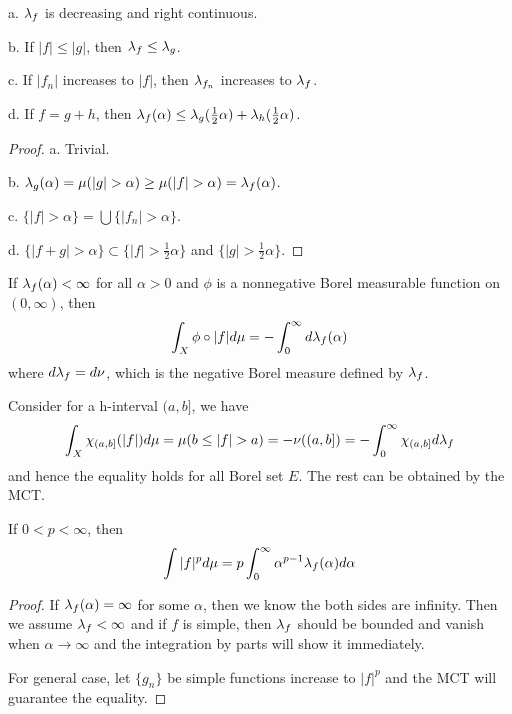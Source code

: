 \begin{proposition}
    a. $\lambda_{f}$ is decreasing and right continuous.\par
    b. If $|f|\leq |g|$, then $\lambda_{f} \leq \lambda_{g}$.\par
    c. If $|f_n|$ increases to $|f|$, then $\lambda_{f_n}$ increases to $\lambda_{f}$.\par
    d. If $f = g+h$, then $\lambda_{f}(\alpha) \leq \lambda_{g}(\tfrac{1}{2}\alpha)+\lambda_{h}(\tfrac{1}{2}\alpha)$.
\end{proposition}
\begin{proof}\par
    a. Trivial.\par
    b. $\dstrb{g}(\alpha) = \mu(|g|>\alpha) \geq \mu(|f|>\alpha) = \dstrb{f}(\alpha)$.\par
    c. $\{|f| > \alpha\} = \bigcup \{|f_n| > \alpha\}$.\par
    d. $\{|f+g|>\alpha\} \subset \{|f|>\tfrac{1}{2}\alpha\}$ and $\{|g|>\tfrac{1}{2}\alpha\}$.
\end{proof}

\begin{proposition}
    If $\lambda_{f}(\alpha) < \infty$ for all $\alpha > 0$ and $\phi$ is a nonnegative Borel measurable function on $(0,\infty)$, then
    \[\int_X \phi\circ |f|d\mu = - \int_0^{\infty}d\lambda_{f}(\alpha)\]
    where $d\lambda_{f} = d\nu$, which is the negative Borel measure defined by $\lambda_{f}$.
\end{proposition}
\begin{proposition}
    Consider for a h-interval $(a,b]$, we have
    \[\int_X \chi_{(a,b]}(|f|)d\mu = \mu(b\leq |f|>a) = -\nu((a,b]) = - \int_0^{\infty} \chi_{(a,b]} d\dstrb{f}\]
    and hence the equality holds for all Borel set $E$. The rest can be obtained by the MCT.
\end{proposition}

\begin{proposition}
    If $0<p<\infty$, then
    \[\int |f|^p d\mu = p\int_0^{\infty}\alpha^{p-1}\lambda_{f}(\alpha)d\alpha\]
\end{proposition}
\begin{proof}\par
    If $\lambda_{f}(\alpha) = \infty$ for some $\alpha$, then we know the both sides are infinity. Then we assume $\lambda_{f}<\infty$ and if $f$ is simple, then $\lambda_{f}$ should be bounded and vanish when $\alpha \to \infty$ and the integration by parts will show it immediately.\par
    For general case, let $\{g_n\}$ be simple functions increase to $|f|^p$ and the MCT will guarantee the equality.
\end{proof}


